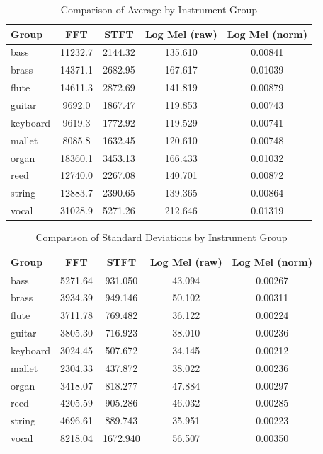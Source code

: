\documentclass[sigconf,natbib=false]{acmart}
\begin{document}
\begin{table} \small
  \caption{Comparison of Average by Instrument Group}
  \label{tab:means_by_group_updated}
  \begin{tabular}{lcccc}
    \toprule
    Group & FFT & STFT & Log Mel (raw) & Log Mel (norm) \\
    \midrule
    bass     & 11232.7 & 2144.32 & 135.610 & 0.00841 \\
    brass    & 14371.1 & 2682.95 & 167.617 & 0.01039 \\
    flute    & 14611.3 & 2872.69 & 141.819 & 0.00879 \\
    guitar   & 9692.0  & 1867.47 & 119.853 & 0.00743 \\
    keyboard & 9619.3  & 1772.92 & 119.529 & 0.00741 \\
    mallet   & 8085.8  & 1632.45 & 120.610 & 0.00748 \\
    organ    & 18360.1 & 3453.13 & 166.433 & 0.01032 \\
    reed     & 12740.0 & 2267.08 & 140.701 & 0.00872 \\
    string   & 12883.7 & 2390.65 & 139.365 & 0.00864 \\
    vocal    & 31028.9 & 5271.26 & 212.646 & 0.01319 \\
    \bottomrule
  \end{tabular}
  \label{tab:avg_metrics_groups}
\end{table}

\begin{table} \small
  \caption{Comparison of Standard Deviations by Instrument Group}
  \label{tab:std_by_group_updated}
  \begin{tabular}{lcccc}
    \toprule
    Group & FFT & STFT & Log Mel (raw) & Log Mel (norm) \\
    \midrule
    bass     & 5271.64 & 931.050 & 43.094 & 0.00267 \\
    brass    & 3934.39 & 949.146 & 50.102 & 0.00311 \\
    flute    & 3711.78 & 769.482 & 36.122 & 0.00224 \\
    guitar   & 3805.30 & 716.923 & 38.010 & 0.00236 \\
    keyboard & 3024.45 & 507.672 & 34.145 & 0.00212 \\
    mallet   & 2304.33 & 437.872 & 38.022 & 0.00236 \\
    organ    & 3418.07 & 818.277 & 47.884 & 0.00297 \\
    reed     & 4205.59 & 905.286 & 46.032 & 0.00285 \\
    string   & 4696.61 & 889.743 & 35.951 & 0.00223 \\
    vocal    & 8218.04 & 1672.940 & 56.507 & 0.00350 \\
    \bottomrule
  \end{tabular}
  \label{tab:stdev_metrics_groups}
\end{table}
\end{document}
